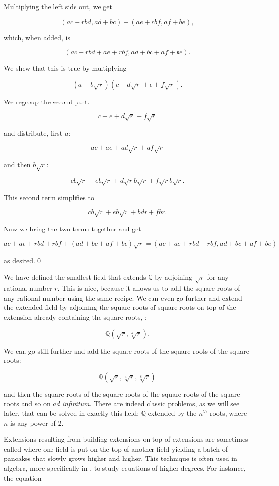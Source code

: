 \documentclass[tikz]{scrreprt}
\begin{document}
Multiplying the left side out, we get

\[
(ac+rbd,ad+bc) + (ae+rbf,af+be),
\]

which, when added, is

\[
(ac+rbd+ae+rbf,ad+bc+af+be).
\]

We show that this is true by multiplying

\[
(a+b\sqrt{r})(c+d\sqrt{r} + e + f\sqrt{r}).
\]

We regroup the second part:

\[
c+e+d\sqrt{r}+f\sqrt{r}
\]

and distribute, first $a$:

\[
ac+ae+ad\sqrt{r}+af\sqrt{r}
\]

and then $b\sqrt{r}$:

\[
cb\sqrt{r}+eb\sqrt{r}+d\sqrt{r}b\sqrt{r}+f\sqrt{r}b\sqrt{r}.
\]

This second term simplifies to

\[
cb\sqrt{r}+eb\sqrt{r}+bdr+fbr.
\]

Now we bring the two terms together and get

\[
ac+ae+rbd+rbf+(ad+bc+af+be)\sqrt{r} = (ac+ae+rbd+rbf,ad+bc+af+be)
\]

as desired.\qed

We have defined the smallest field that extends $\mathbb{Q}$
by adjoining $\sqrt{r}$ for any rational number $r$.
This is nice, because it allows us to add the square roots
of any rational number using the same recipe.
We can even go further and extend the extended field by adjoining
the square roots of square roots on top of the extension already
containing the square roots, \ie:

\[
\mathbb{Q}(\sqrt{r},\sqrt[4]{r}).
\]

We can go still further and add the square roots 
of the square roots of the square roots:

\[
\mathbb{Q}(\sqrt{r},\sqrt[4]{r},\sqrt[8]{r})
\]

and then the square roots of the square roots of the square roots
of the square roots and so on \emph{ad infinitum}.
There are indeed classic problems, as we will see later, that can be solved
in exactly this field: $\mathbb{Q}$ extended by the $n^{th}$-roots,
where $n$ is any power of 2.

Extensions resulting from building extensions on top of extensions 
are sometimes called  where one field is
put on the top of another field yielding a batch of pancakes 
that slowly grows higher and higher.
This technique is often used in algebra, more specifically in 
, to study equations of higher degrees.
For instance, the equation
\end{document}
